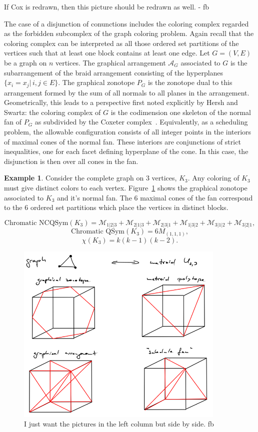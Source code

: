 \documentclass[12pt,reqno]{amsart}
\numberwithin{definition}{section}
\theoremstyle{definition}
\newtheorem{example}[definition]{Example}
\newcommand{\ncM}{\mathcal{M}}
\newcommand{\comment}[1]{\textsf{\footnotesize #1}}
\begin{document}
\comment{If Cox is redrawn, then this picture should be redrawn as well. - fb}

The case of a disjunction of conunctions includes the coloring complex regarded as the forbidden
subcomplex of the graph coloring problem.  Again recall that the
coloring complex can be interpreted as all those ordered set
partitions of the vertices such that at least one block contains at
least one edge.  Let $G=(V,E)$ be a graph on $n$ vertices.  The
graphical arrangement $\mathcal{A}_G$ associated to $G$ is the
subarrangement of the braid arrangement consisting of the hyperplanes
$\{x_i = x_j | \, i,j \in E\}$. The graphical zonotope ${P}_G$ is the
zonotope dual to this arrangement formed by the sum of all normals to
all planes in the arrangement.  Geometrically, this leads to a
perspective first noted explicitly by Hersh and Swartz: the coloring
complex of $G$ is the codimension one skeleton of the normal fan of ${P}_G$
as subdivided by the Coxeter complex~\cite{HS}.  Equivalently, as a scheduling problem,  the
allowable configuration consists of all integer points in the
interiors of maximal cones of the normal fan.  These interiors are
conjunctions of strict inequalities, one for each facet defining
hyperplane of the cone.  In this case, the disjunction is then over
all cones in the fan.

\begin{example}
Consider the complete graph on $3$ vertices, $K_3$.  Any coloring of
$K_3$ must give distinct colors to each vertex.  Figure~\ref{fig:normalfan} shows
the graphical zonotope associated to $K_3$ and it's normal fan.  The
$6$ maximal cones of the fan correspond to the $6$ ordered set
partitions which place the vertices in distinct blocks.

$$\textrm{Chromatic NCQSym}(K_3) = \ncM_{1|2|3} +\ncM_{2|1|3} +\ncM_{2|3|1} +\ncM_{1|3|2} +\ncM_{3|1|2} +\ncM_{3|2|1},$$ 
$$\textrm{Chromatic QSym}(K_3) = 6M_{(1,1,1)},$$
$$\chi(K_3) = k(k-1)(k-2).$$

\end{example}



\begin{figure}[h]
\includegraphics[width=10cm]{graph-matroid.png}
\caption{\comment{I just want the pictures in the left column but side by side. fb}}
\label{fig:normalfan}
\end{figure}
\end{document}
